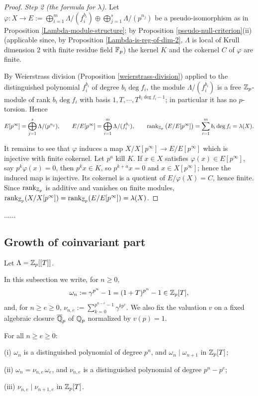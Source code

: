 \begin{proof}
\emph{Step 2 (the formula for $\lambda$).}
Let $\varphi:X\to E:=\bigoplus_{i=1}^m\Lambda/(f_i^{b_i})
\oplus\bigoplus_{j=1}^s\Lambda/(p^{n_j})$ be a pseudo-isomorphism as in
Proposition \ref{Lambda-module-structure}; by
Proposition \ref{pseudo-null-criterion}(ii) (applicable since, by
Proposition \ref{Lambda-is-reg-of-dim-2}, $\Lambda$ is local of Krull dimension
$2$ with finite residue field ${\mathbb {F}}_p$) the kernel $K$ and the cokernel $C$ of
$\varphi$ are finite.

By Weierstrass division (Proposition \ref{weierstrass-division}) applied to the
distinguished polynomial $f_i^{b_i}$ of degree $b_i\deg f_i$, the module
$\Lambda/(f_i^{b_i})$ is a free ${\mathbb {Z}}_p$-module of rank $b_i\deg f_i$ with basis
$1,T,\cdots,T^{b_i\deg f_i-1}$; in particular it has no $p$-torsion. Hence
$$E[p^\infty]=\bigoplus_{j=1}^s\Lambda/(p^{n_j}),\qquad
E/E[p^\infty]=\bigoplus_{i=1}^m\Lambda/(f_i^{b_i}),\qquad
\operatorname{rank}_{{\mathbb {Z}}_p}\big(E/E[p^\infty]\big)=\sum_{i=1}^mb_i\deg f_i=\lambda(X).$$

It remains to see that $\varphi$ induces a map
$X/X[p^\infty]\to E/E[p^\infty]$ which is injective with finite cokernel.
Let $p^a$ kill $K$. If $x\in X$ satisfies $\varphi(x)\in E[p^\infty]$, say
$p^k\varphi(x)=0$, then $p^kx\in K$, so $p^{k+a}x=0$ and $x\in X[p^\infty]$;
hence the induced map is injective.
Its cokernel is a quotient of $E/\varphi(X)=C$, hence finite.
Since $\operatorname{rank}_{{\mathbb {Z}}_p}$ is additive and vanishes on finite modules,
$\operatorname{rank}_{{\mathbb {Z}}_p}(X/X[p^\infty])=\operatorname{rank}_{{\mathbb {Z}}_p}(E/E[p^\infty])=\lambda(X)$.
\end{proof}

......

\subsection{Growth of coinvariant part}

Let $\Lambda={\mathbb {Z}}_p[[T]]$.

In this subsection we write, for $n\geq 0$,
$$
\omega_n:=\gamma^{p^n}-1=(1+T)^{p^n}-1\in{\mathbb {Z}}_p[T],
$$
and, for $n\geq e\geq 0$, $\nu_{n,e}:=\sum_{k=0}^{p^{n-e}-1}\gamma^{kp^e}$.
We also fix the valuation $v$ on a fixed algebraic closure $\overline{{\mathbb {Q}}}_p$ of ${\mathbb {Q}}_p$
normalized by $v(p)=1$.

\begin{lem}
\label{nu-distinguished}
\leanok
For all $n\geq e\geq 0$:

{\rm(i)} $\omega_n$ is a distinguished polynomial of degree $p^n$, and
$\omega_n\mid\omega_{n+1}$ in ${\mathbb {Z}}_p[T]$;

{\rm(ii)} $\omega_n=\nu_{n,e}\,\omega_e$, and $\nu_{n,e}$ is a distinguished
polynomial of degree $p^n-p^e$;

{\rm(iii)} $\nu_{n,e}\mid\nu_{n+1,e}$ in ${\mathbb {Z}}_p[T]$.
\end{lem}

